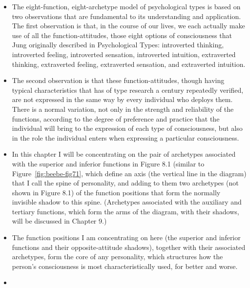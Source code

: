 \begin{itemize}

\item

The eight-function, eight-archetype model of psychological types is based on
two observations that are fundamental to its understanding and application. The
first observation is that, in the course of our lives, we each actually make
use of all the function-attitudes, those eight options of consciousness that
Jung originally described in Psychological Types: introverted thinking,
introverted feeling, introverted sensation, introverted intuition, extraverted
thinking, extraverted feeling, extraverted sensation, and extraverted
intuition.

\item

The second observation is that these function-attitudes, though having typical
characteristics that has of type research a century repeatedly verified, are
not expressed in the same way by every individual who deploys them. There is a
normal variation, not only in the strength and reliability of the functions,
according to the degree of preference and practice that the individual will
bring to the expression of each type of consciousness, but also in the role the
individual enters when expressing a particular consciousness.

\item

In this chapter I will be concentrating on the pair of archetypes associated
with the superior and inferior functions in Figure 8.1 (similar to
Figure~\ref{fig:beebe-fig71}, which define an axis (the vertical line in the
diagram) that I call the spine of personality, and adding to them two
archetypes (not shown in Figure 8.1) of the function positions that form the
normally invisible shadow to this spine. (Archetypes associated with the
auxiliary and tertiary functions, which form the arms of the diagram, with
their shadows, will be discussed in Chapter 9.)

\item

The function positions I am concentrating on here (the superior and inferior
functions and their opposite-attitude shadows), together with their associated
archetypes, form the core of any personality, which structures how the person's
consciousness is most characteristically used, for better and worse.

\item


\end{itemize}
